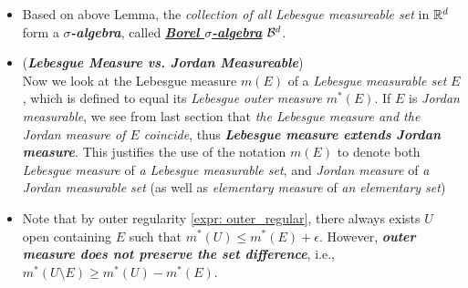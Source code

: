 \documentclass[11pt]{article}
\begin{document}
\begin{itemize}
\begin{proof}
\begin{itemize}
\item The statement 5. is the result of statement 3, 4. and \emph{de Morgan’s laws}. \qed
\end{itemize}
\end{proof}

\item \begin{remark} 
Based on above Lemma, the \emph{collection of all Lebesgue measureable set} in ${\mathbb R}^{d}$ form a \emph{\textbf{$\sigma$-algebra}}, called \emph{\textbf{\underline{Borel $\sigma$-algebra}}} ${\mathcal B}^{d}$.
\end{remark}

\item \begin{remark} (\emph{\textbf{Lebesgue Measure vs. Jordan Measureable}})\\
Now we look at the Lebesgue measure $m(E)$ of a \emph{Lebesgue measurable set} $E$, which is defined to equal its \emph{Lebesgue outer measure} $m^{*}(E)$. If $E$ is \emph{Jordan measurable}, we see from last section that \emph{the Lebesgue measure and the Jordan measure of $E$ coincide}, thus \textbf{\emph{Lebesgue measure extends Jordan measure}}. This justifies the use of the notation $m(E)$ to denote both \emph{Lebesgue measure} of \emph{a Lebesgue measurable set}, and \emph{Jordan measure} of \emph{a Jordan measurable set} (as well as \emph{elementary measure} of \emph{an elementary set})
\end{remark}


\item \begin{remark} 
Note that by outer regularity \ref{expr: outer_regular}, there always exists $U$ open containing $E$ such that $m^{*}(U)\le m^{*}(E)+\epsilon$. However, \emph{\textbf{outer measure does not preserve the set difference}}, i.e., $m^{*}(U \setminus  E)\ge m^{*}(U)- m^{*}(E)$. 
\end{remark}


\end{itemize}
\end{document}
